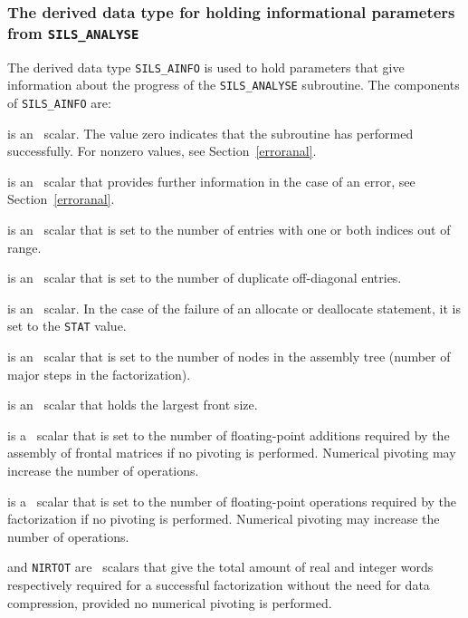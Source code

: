 \documentclass{galahad}
\newcommand{\packagename}{SILS}
\begin{document}

\subsubsection{The derived data type for holding informational
 parameters from {\tt \packagename\_ANALYSE}}\label{typeinfoa}
The derived data type 
{\tt \packagename\_AINFO} 
is used to hold parameters that give information about the progress of the
{\tt \packagename\_AN\-ALYSE} subroutine. The components of
{\tt \packagename\_AINFO} 
are:

\begin{description}

 is an \integer\ scalar. The value 
 zero indicates that the subroutine has performed 
 successfully.  For nonzero values, see Section~\ref{erroranal}. 
 
 is an \integer\ scalar that provides further information in the 
case of an error, see Section~\ref{erroranal}. 
 
 is an \integer\ scalar that is set to the number of 
entries with one or both indices out of range.  
 
 is an \integer\ scalar that is set to the number of 
duplicate off-diagonal entries. 
 
 is an \integer\ scalar. In the case of the failure of an 
allocate or deallocate statement, it is set to the {\tt STAT} value. 
 
 is an \integer\ scalar that is set to the number of  
 nodes in the assembly tree (number of major steps in the 
 factorization). 
 
  is an \integer\ scalar that holds the largest front size. 
 
 is a \realdp\ scalar that is set to the number of 
 floating-point additions required by the assembly of frontal 
 matrices if no pivoting 
 is performed.  Numerical pivoting may increase the number of 
 operations. 
 
 is a \realdp\ scalar that is set to the number of 
 floating-point operations required by the factorization if no pivoting 
 is performed.  Numerical pivoting may increase the number of 
 operations. 
 
 and {\tt NIRTOT} are \integer\ scalars that give the total 
 amount of real and integer words respectively required for a 
 successful factorization without the need for data compression, 
 provided no numerical pivoting is performed.   
 

\end{description}
\end{document}
